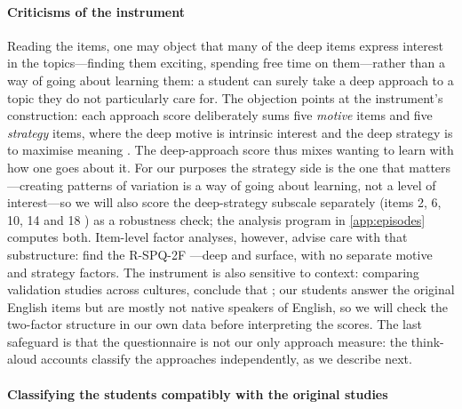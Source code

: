 \paragraph{Criticisms of the instrument}

Reading the items, one may object that many of the deep items express
interest in the topics---finding them exciting, spending free time on
them---rather than a way of going about learning them: a student can
surely take a deep approach to a topic they do not particularly care
for.
The objection points at the instrument's construction: each approach
score deliberately sums five \emph{motive} items and five \emph{strategy}
items, where the deep motive is intrinsic interest and the deep strategy
is to maximise meaning \autocite{RSPQ2F}.
The deep-approach score thus mixes wanting to learn with how one goes
about it.
For our purposes the strategy side is the one that matters---creating
patterns of variation is a way of going about learning, not a level of
interest---so we will also score the deep-strategy subscale separately
(items 2, 6, 10, 14 and 18 \autocite[p.~149]{RSPQ2F}) as a robustness
check; the analysis program in \cref{app:episodes} computes both.
Item-level factor analyses, however, advise care with that substructure:
\textcite{RSPQ2FReexamined} find the R-SPQ-2F
---deep and surface, with no separate
motive and strategy factors.
The instrument is also sensitive to context: comparing validation
studies across cultures, \textcite{RSPQ2FCrossCultural} conclude that
; our
students answer the original English items but are mostly not native
speakers of English, so we will check the two-factor structure in our
own data before interpreting the scores.
The last safeguard is that the questionnaire is not our only approach
measure: the think-aloud accounts classify the approaches independently,
as we describe next.

\paragraph{Classifying the students compatibly with the original studies}

